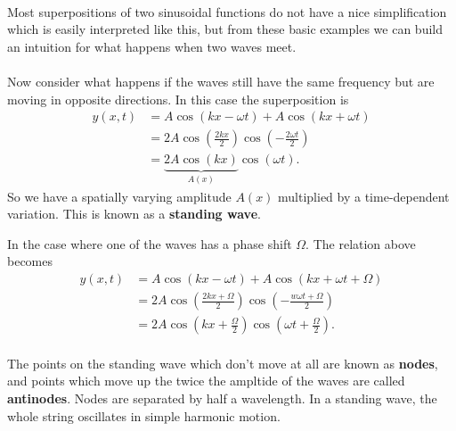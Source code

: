 \documentclass[../classical_mechanics.tex]{subfiles}
\begin{document}
        \paragraph{}
        Most superpositions of two sinusoidal functions do not have a nice simplification which is easily interpreted like this, but from these basic examples we can build an intuition for what happens when two waves meet.

        \paragraph{}
        Now consider what happens if the waves still have the same frequency but are moving in opposite directions.
        In this case the superposition is
        \begin{align}
            y(x,t)&=A\cos(kx-\omega t)+A\cos(kx+\omega t)\\
            &=2A\cos\left(\frac{2kx}{2}\right)\cos\left(-\frac{2\omega t}{2}\right)\\
            &=\underbrace{2A\cos(kx)}_{A(x)}\cos(\omega t).
        \end{align}
        So we have a spatially varying amplitude $A(x)$ multiplied by a time-dependent variation.
        This is known as a \textbf{standing wave}.
        \begin{example}
            In the case where one of the waves has a phase shift $\Omega$. The relation above becomes
            \begin{align}
                y(x,t)&=A\cos(kx-\omega t)+A\cos(kx+\omega t+\Omega)\\
                &=2A\cos\left(\frac{2kx+\Omega}{2}\right)\cos\left(-\frac{w\omega t+\Omega}{2}\right)\\
                &=2A\cos\left(kx+\frac{\Omega}{2}\right)\cos\left(\omega t+\frac{\Omega}{2}\right).
            \end{align}
        \end{example}

        \paragraph{}
        The points on the standing wave which don't move at all are known as \textbf{nodes}, and points which move up the twice the ampltide of the waves are called \textbf{antinodes}.
        Nodes are separated by half a wavelength.
        In a standing wave, the whole string oscillates in simple harmonic motion.
\end{document}

